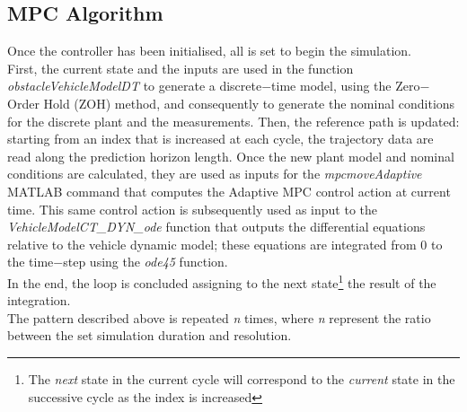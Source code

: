 \subsection{MPC Algorithm}  
Once the controller has been initialised, all is set to begin the simulation.\\
First, the current state and the inputs are used in the function \textit{obstacleVehicleModelDT} to generate a discrete$-$time model, using the Zero$-$Order Hold (ZOH) method, and consequently to generate the nominal conditions for the discrete plant and the measurements. Then, the reference path is updated: starting from an index that is increased at each cycle, the trajectory data are read along the prediction horizon length. Once the new plant model and nominal conditions are calculated, they are used as inputs for the \textit{mpcmoveAdaptive} MATLAB command that computes the Adaptive MPC control action at current time. This same control action is subsequently used as input to the \textit{VehicleModelCT\_DYN\_ode} function that outputs the differential equations relative to the vehicle dynamic model; these equations are integrated from 0 to the time$-$step using the \textit{ode45} function.
\\In the end, the loop is concluded assigning to the next state\footnote{The \textit{next} state in the current cycle will correspond to the \textit{current} state in the successive cycle as the index is increased} the result of the integration.\\
The pattern described above is repeated \textit{n} times, where \textit{n} represent the ratio between the set simulation duration and resolution.


